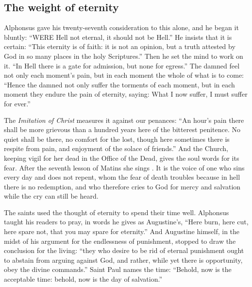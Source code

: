 \subsection{The weight of eternity}

Alphonsus gave his twenty-seventh consideration to this alone, and he began it bluntly: ``WERE Hell not eternal, it should not be Hell.'' He insists that it is certain: ``This eternity is of faith: it is not an opinion, but a truth attested by God in so many places in the holy Scriptures.'' Then he set the mind to work on it. ``In Hell there is a gate for admission, but none for egress.'' The damned feel not only each moment's pain, but in each moment the whole of what is to come: ``Hence the damned not only suffer the torments of each moment, but in each moment they endure the pain of eternity, saying: What I now suffer, I must suffer for ever.''

The \emph{Imitation of Christ} measures it against our penances: ``An hour's pain there shall be more grievous than a hundred years here of the bitterest penitence. No quiet shall be there, no comfort for the lost, though here sometimes there is respite from pain, and enjoyment of the solace of friends.'' And the Church, keeping vigil for her dead in the Office of the Dead, gives the soul words for its fear. After the seventh lesson of Matins she sings . It is the voice of one who sins every day and does not repent, whom the fear of death troubles because in hell there is no redemption, and who therefore cries to God for mercy and salvation while the cry can still be heard.

The saints used the thought of eternity to spend their time well. Alphonsus taught his readers to pray, in words he gives as Augustine's, ``Here burn, here cut, here spare not, that you may spare for eternity.'' And Augustine himself, in the midst of his argument for the endlessness of punishment, stopped to draw the conclusion for the living: ``they who desire to be rid of eternal punishment ought to abstain from arguing against God, and rather, while yet there is opportunity, obey the divine commands.'' Saint Paul names the time: ``Behold, now is the acceptable time: behold, now is the day of salvation.''

